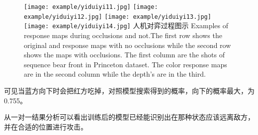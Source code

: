 \begin{figure}[!htpb]
	\centering
	{\texttt{[image: example/yiduiyi11.jpg]}}
	\hspace{0.5em}
	{\texttt{[image: example/yiduiyi12.jpg]}}
	\newline
	\centering
	{\texttt{[image: example/yiduiyi13.jpg]}}
	\hspace{0.5em}
	{\texttt{[image: example/yiduiyi14.jpg]}}
	\bicaption
	{人机对弈过程图示}
	{Examples of response maps during occlusions and not.The first row shows the original and response maps with no occlusions while the second row shows the maps with occlusions. The first column are the shots of sequence bear front in Princeton dataset. The color response maps are in the second column while the depth’s are in the third.}
	\label{fig2:yiduiyi11-14}
\end{figure}
可见当蓝方向下时会把红方吃掉，对照模型搜索得到的概率，向下的概率最大，为0.755。

从一对一结果分析可以看出训练后的模型已经能识别出在那种状态应该远离敌方，并在合适的位置进行攻击。




